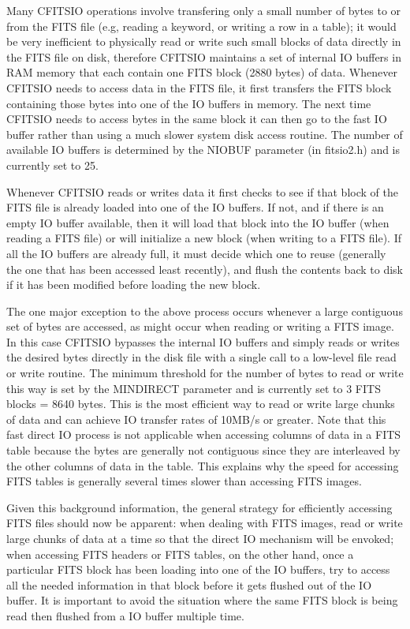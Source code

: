 Many CFITSIO operations involve transfering only a small number of
bytes to or from the FITS file (e.g, reading a keyword, or writing a
row in a table); it would be very inefficient to physically read or
write such small blocks of data directly in the FITS file on disk,
therefore CFITSIO maintains a set of internal IO buffers in RAM memory
that each contain one FITS block (2880 bytes) of data.  Whenever
CFITSIO needs to access data in the FITS file, it first transfers the
FITS block containing those bytes into one of the IO buffers in
memory.  The next time CFITSIO needs to access bytes in the same block
it can then go to the fast IO buffer rather than using a much slower
system disk access routine.  The number of available IO buffers is
determined by the NIOBUF parameter (in fitsio2.h) and is currently set
to 25.

Whenever CFITSIO reads or writes data it first checks to see if that
block of the FITS file is already loaded into one of the IO buffers.
If not, and if there is an empty IO buffer available, then it will load
that block into the IO buffer (when reading a FITS file) or will
initialize a new block (when writing to a FITS file).  If all the IO
buffers are already full, it must decide which one to reuse (generally
the one that has been accessed least recently), and flush the contents
back to disk if it has been modified before loading the new block.

The one major exception to the above process occurs whenever a large
contiguous set of bytes are accessed, as might occur when reading or
writing a FITS image.  In this case CFITSIO bypasses the internal IO
buffers and simply reads or writes the desired bytes directly in the
disk file with a single call to a low-level file read or write
routine.  The minimum threshold for the number of bytes to read or
write this way is set by the MINDIRECT parameter and is currently set
to 3 FITS blocks = 8640 bytes.  This is the most efficient way to read
or write large chunks of data and can achieve IO transfer rates of
10MB/s or greater.  Note that this fast direct IO process is not
applicable when accessing columns of data in a FITS table because the
bytes are generally not contiguous since they are interleaved by the
other columns of data in the table.  This explains why the speed for
accessing FITS tables is generally several times slower than accessing
FITS images.

Given this background information, the general strategy for efficiently
accessing FITS files should now be apparent:  when dealing with FITS
images, read or write large chunks of data at a time so that the direct
IO mechanism will be envoked;  when accessing FITS headers or FITS
tables, on the other hand, once a particular FITS block has been
loading into one of the IO buffers, try to access all the needed
information in that block before it gets flushed out of the IO buffer.
It is important to avoid the situation where the same FITS block is
being read then flushed from a IO buffer multiple time.

